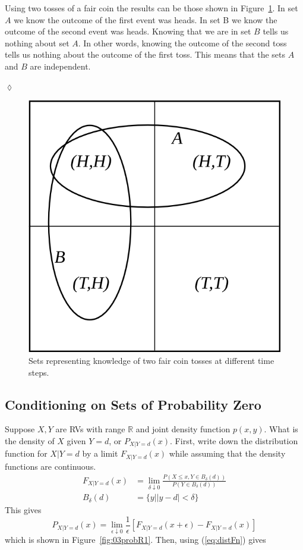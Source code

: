 \begin{example}
Using two tosses of a fair coin the results can be those shown in Figure~\ref{fig:03coinProb}.
In set $A$ we know the outcome of the first event was heads.
In set B we know the outcome of the second event was heads.
Knowing that we are in set $B$ tells us nothing about set $A$.
In other words, knowing the outcome of the second toss tells us nothing about the outcome of the first toss.
This means that the sets $A$ and $B$ are independent.
\end{example}
$\lozenge$

\begin{figure}[ht!]
\centering
\includegraphics[width=.3\textwidth]{images/03coinProb}
\caption{Sets representing knowledge of two fair coin tosses at different time steps.}
\label{fig:03coinProb}
\end{figure}

\subsection{Conditioning on Sets of Probability Zero}
Suppose $X,Y$ are RVs with range $\mathbb{R}$ and joint density function $p(x,y)$.
What is the density of $X$ given $Y=d$, or $P_{X|Y=d}(x)$.
First, write down the distribution function for $X|Y=d$ by a limit $F_{X|Y=d}(x)$ while assuming that the density functions are continuous.
\begin{align}
\label{eq:distFn}
F_{X|Y=d}(x) &= \lim_{\delta\downarrow 0}\frac{P(X\leq x, Y\in B_\delta(d))}{P(Y\in B_\delta(d))} \\
B_\delta(d) &= \{y | |y-d| < \delta\} \nonumber
\end{align}
This gives
$$P_{X|Y=d}(x) = \lim_{\epsilon\downarrow 0}\frac{1}{\epsilon}[F_{X|Y=d}(x+\epsilon) - F_{X|Y=d}(x)]$$
which is shown in Figure~\ref{fig:03probR1}.
Then, using (\ref{eq:distFn}) gives

